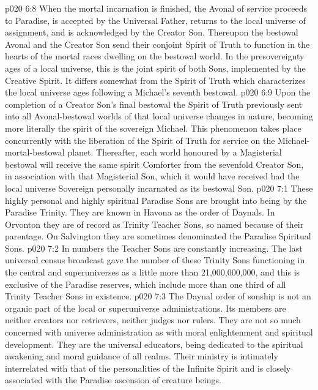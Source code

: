 \vs p020 6:8 When the mortal incarnation is finished, the Avonal of service proceeds to Paradise, is accepted by the Universal Father, returns to the local universe of assignment, and is acknowledged by the Creator Son. Thereupon the bestowal Avonal and the Creator Son send their conjoint Spirit of Truth to function in the hearts of the mortal races dwelling on the bestowal world. In the presovereignty ages of a local universe, this is the joint spirit of both Sons, implemented by the Creative Spirit. It differs somewhat from the Spirit of Truth which characterizes the local universe ages following a Michael’s seventh bestowal.
\vs p020 6:9 Upon the completion of a Creator Son’s final bestowal the Spirit of Truth previously sent into all Avonal\hyp{}bestowal worlds of that local universe changes in nature, becoming more literally the spirit of the sovereign Michael. This phenomenon takes place concurrently with the liberation of the Spirit of Truth for service on the Michael\hyp{}mortal\hyp{}bestowal planet. Thereafter, each world honoured by a Magisterial bestowal will receive the same spirit Comforter from the sevenfold Creator Son, in association with that Magisterial Son, which it would have received had the local universe Sovereign personally incarnated as its bestowal Son.
\vs p020 7:1 These highly personal and highly spiritual Paradise Sons are brought into being by the Paradise Trinity. They are known in Havona as the order of Daynals. In Orvonton they are of record as Trinity Teacher Sons, so named because of their parentage. On Salvington they are sometimes denominated the Paradise Spiritual Sons.
\vs p020 7:2 In numbers the Teacher Sons are constantly increasing. The last universal census broadcast gave the number of these Trinity Sons functioning in the central and superuniverses as a little more than 21,000,000,000, and this is exclusive of the Paradise reserves, which include more than one third of all Trinity Teacher Sons in existence.
\vs p020 7:3 The Daynal order of sonship is not an organic part of the local or superuniverse administrations. Its members are neither creators nor retrievers, neither judges nor rulers. They are not so much concerned with universe administration as with moral enlightenment and spiritual development. They are the universal educators, being dedicated to the spiritual awakening and moral guidance of all realms. Their ministry is intimately interrelated with that of the personalities of the Infinite Spirit and is closely associated with the Paradise ascension of creature beings.
